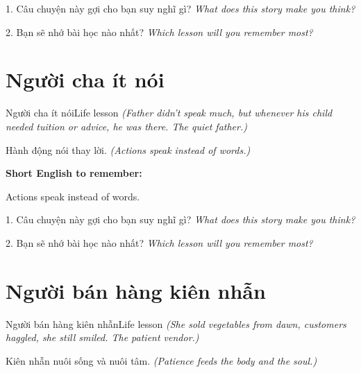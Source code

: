 \begin{tuhocnhanh}
1. Câu chuyện này gợi cho bạn suy nghĩ gì? \textit{What does this story make you think?}

2. Bạn sẽ nhớ bài học nào nhất? \textit{Which lesson will you remember most?}
\end{tuhocnhanh}
\ngancach


\section{Người cha ít nói}
\begin{truyen}{Người cha ít nói}{Life lesson}
\textit{(Father didn't speak much, but whenever his child needed tuition or advice, he was there. The quiet father.)}
\end{truyen}

\begin{baihoc}
Hành động nói thay lời.
\textit{(Actions speak instead of words.)}
\end{baihoc}

\begin{ghinhoanh}
\textbf{Short English to remember:}

Actions speak instead of words.

\end{ghinhoanh}

\begin{tuhocnhanh}
1. Câu chuyện này gợi cho bạn suy nghĩ gì? \textit{What does this story make you think?}

2. Bạn sẽ nhớ bài học nào nhất? \textit{Which lesson will you remember most?}
\end{tuhocnhanh}
\ngancach


\section{Người bán hàng kiên nhẫn}
\begin{truyen}{Người bán hàng kiên nhẫn}{Life lesson}
\textit{(She sold vegetables from dawn, customers haggled, she still smiled. The patient vendor.)}
\end{truyen}

\begin{baihoc}
Kiên nhẫn nuôi sống và nuôi tâm.
\textit{(Patience feeds the body and the soul.)}
\end{baihoc}


